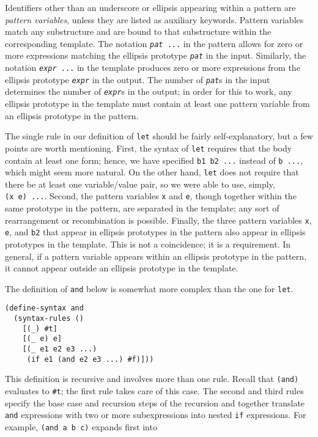 Identifiers other than an underscore or ellipsis appearing within a
pattern are \label{further_s19}\textit{pattern variables}, unless they
are listed as auxiliary keywords.
Pattern variables match any substructure and are bound to that
substructure within the corresponding template.
\label{further_s20}\label{further_s21}The notation
\texttt{\textit{pat} ...} in the pattern allows for zero or more
expressions matching the ellipsis prototype \texttt{\textit{pat}} in the input.
Similarly, the notation \texttt{\textit{expr} ...} in the template produces
zero or more expressions from the ellipsis prototype \texttt{\textit{expr}} in the output.
The number of \texttt{\textit{pat}}s in the input determines the number of \texttt{\textit{expr}}s
in the output; in order for this to work, any ellipsis prototype in the
template must contain at least one pattern variable from an ellipsis
prototype in the pattern.


The single rule in our definition of \texttt{let} should be fairly
self-explanatory, but a few points are worth mentioning.
First, the syntax of \texttt{let} requires that the body contain at least one
form; hence, we have specified \texttt{b1 b2 ...} instead of
\texttt{b ...}, which might seem more natural.
On the other hand, \texttt{let} does not require that there be at least one
variable/value pair, so we were able to use, simply, \texttt{(x e) ...}.
Second, the pattern variables \texttt{x} and \texttt{e}, though together within
the same prototype in the pattern, are separated in the template; any sort
of rearrangement or recombination is possible.
Finally, the three pattern variables \texttt{x}, \texttt{e}, and \texttt{b2} that
appear in ellipsis prototypes in the pattern also appear in ellipsis
prototypes in the template.
This is not a coincidence; it is a requirement.
In general, if a pattern variable appears within an ellipsis prototype in
the pattern, it cannot appear outside an ellipsis prototype in the template.


The definition of \label{further_s22}\texttt{and} below is somewhat more complex than the
one for \texttt{let}.


\begin{alltt}
(define-syntax and\label{further_defn_and}
  (syntax-rules ()
    [(\_{}) \#{}t]
    [(\_{} e) e]
    [(\_{} e1 e2 e3 ...)
     (if e1 (and e2 e3 ...) \#{}f)]))
\end{alltt}


This definition is recursive and involves more than one rule.
Recall that \texttt{(and)} evaluates to \texttt{\#{}t}; the first rule takes care of
this case.
The second and third rules specify the base case and recursion steps
of the recursion and together translate \texttt{and} expressions with
two or more subexpressions into nested \texttt{if} expressions.
For example, \texttt{(and a b c)} expands first into


